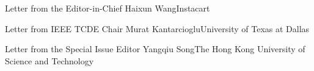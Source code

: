 \documentclass[11pt]{article}
\begin{document}


\begin{bulletin}


%
%

\begin{lettersection}


\begin{letter}{Letter from the Editor-in-Chief}
{Haixun Wang}{Instacart}

\end{letter}
%
\newpage

\begin{letter}{Letter from IEEE TCDE Chair}
{Murat Kantarcioglu}{University of Texas at Dallas}

\end{letter}
%
\newpage

%
%
\begin{letter}{Letter from the Special Issue Editor} %
{Yangqiu Song}{The Hong Kong University of Science and Technology}


\end{letter}

\newpage


\end{lettersection}


\end{bulletin}
\end{document}
